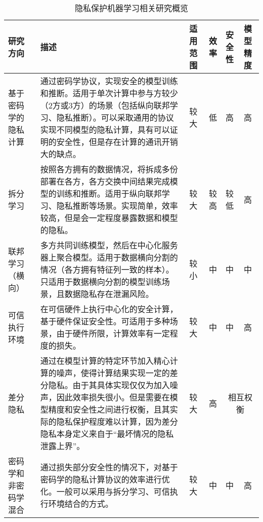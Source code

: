 \begin{table}[h]
    \small
    \label{tab:related_work}
    \caption{隐私保护机器学习相关研究概览}
    \begin{tabular}{p{45pt}p{250pt}p{22pt}cp{22pt}p{22pt}}
    \toprule
        研究方向       & 描述                                                                                       & 适用范围 & 效率 & 安全性 & 模型精度 \\ \midrule
        基于密码学的隐私计算 &
          通过密码学协议，实现安全的模型训练和推断。适用于单次计算中参与方较少（2方或3方）的场景（包括纵向联邦学习、隐私推断）。可以采取通用的协议实现不同模型的隐私计算，具有可以证明的安全性，但是存在计算的通讯开销大的缺点。 &
          较大 &
          低 &
          高 &
          高 \\ \midrule
        拆分学习       & 按照各方拥有的数据情况，将拆成多份部署在各方，各方交换中间结果完成模型的训练和推断。适用于纵向联邦学习、隐私推断等场景。实现简单，效率较高，但是会一定程度暴露数据和模型的隐私。 & 较大   & 较高  & 较低   & 高    \\ \midrule
        联邦学习（横向）   & 多方共同训练模型，然后在中心化服务器上聚合模型。适用于数据横向分割的情况（各方拥有特征列一致的样本）。只适用于数据横向分割的模型训练场景，且数据隐私存在泄漏风险。 & 较小   & 中  & 中   & 中    \\ \midrule
        可信执行环境     & 在可信硬件上执行中心化的安全计算，基于硬件保证安全性。可适用于多种场景，由于硬件所限，计算效率有一定程度的损失。                                 & 较大   & 中  & 中   & 高    \\ \midrule
        差分隐私 &
          通过在模型计算的特定环节加入精心计算的噪声，使得计算结果实现一定的差分隐私。由于其具体实现仅仅为加入噪声，因此效率损失很小。但是需要在模型精度和安全性之间进行权衡，且其实际的隐私保护程度难以计算，因为差分隐私本身定义来自于“最坏情况的隐私泄露上界”。 &
          较大 &
          高 &
          \multicolumn{2}{c}{相互权衡} \\ \midrule
        密码学和非密码学混合 & 通过损失部分安全性的情况下，对基于密码学的隐私计算协议的效率进行优化。一般可以采用与拆分学习、可信执行环境结合的方式。                              & 较大   & 中  & 中   & 高    \\ \bottomrule
        \end{tabular}
\end{table}



